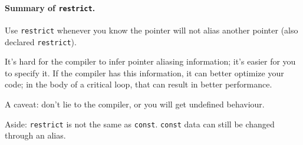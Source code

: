 \paragraph{Summary of {\tt restrict}.}
Use {\tt restrict} whenever you know the pointer will not alias
another pointer (also declared {\tt restrict}).

It's hard for the compiler to infer pointer aliasing information;
it's easier for you to specify it. If the compiler has this information,
it can better optimize your code; in the body of a critical loop, that
can result in better performance.

A caveat: don't lie to the compiler, or you will get undefined behaviour.

Aside: {\tt restrict} is not the same as {\tt const}. {\tt const} data can still be
changed through an alias.






